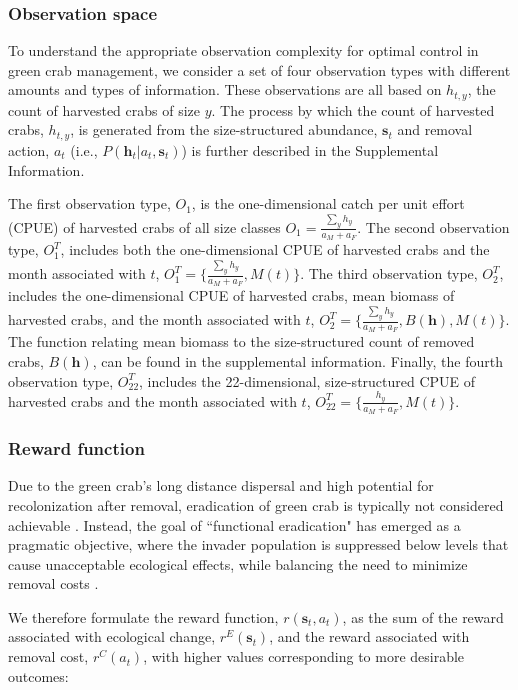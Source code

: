\documentclass{article}
\begin{document}
\subsubsection{Observation space}

To understand the appropriate observation complexity for optimal control in green crab management, we consider a set of four observation types with different amounts and types of information. These observations are all based on $h_{t,y}$, the count of harvested crabs of size $y$. The process by which the count of harvested crabs, $h_{t,y}$, is generated from the size-structured abundance, $\textbf{s}_t$ and removal action, $a_t$ (i.e., $P(\textbf{h}_t | a_t, \textbf{s}_t)$) is further described in the Supplemental Information.

The first observation type, $O_1$, is the one-dimensional catch per unit effort (CPUE) of harvested crabs of all size classes $O_1 = \frac{\sum_yh_y}{a_{M}+a_{F}}$. The second observation type, $O^T_1$, includes both the one-dimensional CPUE of harvested crabs and the month associated with $t$, $O^T_1 = \{\frac{\sum_yh_y}{a_M+a_F}, M(t)\}$. The third observation type, $O^T_2$, includes the one-dimensional CPUE of harvested crabs, mean biomass of harvested crabs, and the month associated with $t$, $O^T_2 = \{\frac{\sum_yh_y}{a_M+a_F}, B(\textbf{h}),M(t)\}$. The function relating mean biomass to the size-structured count of removed crabs, $B(\textbf{h})$, can be found in the supplemental information. Finally, the fourth observation type, $O^T_{22}$, includes the 22-dimensional, size-structured CPUE of harvested crabs and the month associated with $t$, $O^T_{22} = \{\frac{h_y}{a_M+a_F}, M(t)\}$.

\subsubsection{Reward function}

Due to the green crab's long distance dispersal and high potential for recolonization after removal, eradication of green crab is typically not considered achievable \parencite{tummon2024rebound}. Instead, the goal of ``functional eradication" has emerged as a pragmatic objective, where the invader population is suppressed below levels that cause unacceptable ecological effects, while balancing the need to minimize removal costs \parencite{green2021functional}.

We therefore formulate the reward function, $r(\textbf{s}_t, a_t)$, as the sum of the reward associated with ecological change, $r^E(\textbf{s}_t)$, and the reward associated with removal cost, $r^C(a_t)$, with higher values corresponding to more desirable outcomes:
\end{document}

